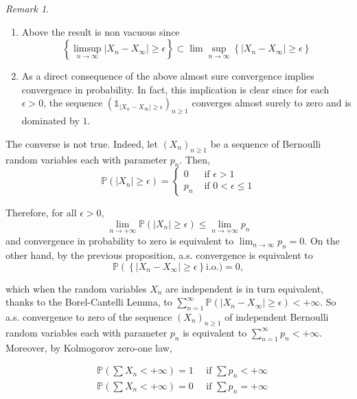 \documentclass{amsbook}
\theoremstyle{plain}%
\theoremstyle{definition}
\theoremstyle{remark}
\newtheorem*{rem}{Remark}
\newcommand{\io}{\text{i.o.}}
\begin{document}
\begin{rem}
  \begin{enumerate}
    \item Above the result is non vacuous since
      \[ \left\{\limsup _{n \rightarrow \infty}\left|X_{n}-X_{\infty}\right| \geq \epsilon\right\} \subset \lim \sup _{n \rightarrow \infty}\left\{\left|X_{n}-X_{\infty}\right| \geq \epsilon\right\} \]
    \item As a direct consequence of the above almost sure convergence implies convergence in probability. In fact, this implication is clear since for each $\epsilon>0$, the sequence $\left(\mathbb{1}_{\left|X_{n}-X_{\infty}\right| \geq \epsilon}\right)_{n \geq 1}$ converges almost surely to zero and is dominated by $1$.
  \end{enumerate}
\end{rem}

The converse is not true. Indeed, let $\left(X_{n}\right)_{n \geq 1}$ be a sequence of Bernoulli random variables each with parameter $p_{n}$. Then,
\[
  \mathbb{P}\left(\left|X_{n}\right| \geq \epsilon\right)=
  \begin{cases}0 & \text { if } \epsilon>1 \\ p_{n} & \text { if } 0<\epsilon \leq 1
  \end{cases}
\]

Therefore, for all $\epsilon>0$,
\[
  \lim _{n \rightarrow+\infty} \mathbb{P}\left(\left|X_{n}\right| \geq \epsilon\right) \leq \lim _{n \rightarrow+\infty} p_{n}
\]
and convergence in probability to zero is equivalent to $\lim_{n \rightarrow \infty} p_{n}=0$.
On the other hand, by the previous proposition, a.s. convergence is equivalent to
\[\mathbb{P}\left(\left\{\left|X_{n}-X_{\infty}\right| \geq \epsilon\right\}\right. \io )=0,\]

which when the random variables $X_{n}$ are independent is in turn equivalent, thanks to the Borel-Cantelli Lemma, to $\sum_{n=1}^{\infty} \mathbb{P}\left(\left|X_{n}-X_{\infty}\right| \geq \epsilon\right)<+\infty$. So a.s. convergence to zero of the sequence $\left(X_{n}\right)_{n \geq 1}$ of independent Bernoulli random variables each with parameter $p_{n}$ is equivalent to $\sum_{n=1}^{\infty} p_{n}<+\infty$. Moreover, by Kolmogorov zero-one law,

$$
\begin{aligned}
  & \mathbb{P}\left(\sum X_{n}<+\infty\right)=1 \quad \text { if } \sum p_{n}<+\infty \\
  & \mathbb{P}\left(\sum X_{n}<+\infty\right)=0 \quad \text { if } \sum p_{n}=+\infty
\end{aligned}
$$
\end{document}
